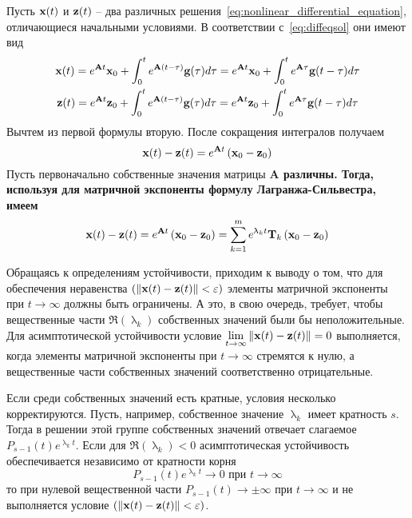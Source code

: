 Пусть $\bf{x}(t)$ и $\bf{z}(t)$ -- два различных решения~\eqref{eq:nonlinear_differential_equation}, отличающиеся начальными условиями. В
соответствии с~\eqref{eq:diffeqsol} они имеют вид
\begin{gather*}
    \bf{x}(t) = e^{\bf{A}t}\bf{x}_0 + \int_{0}^{t} e^{\bf{A}(t - \tau)}\bf{g}(\tau)d\tau = e^{\bf{A}t}\bf{x}_0 + \int_{0}^{t} e^{\bf{A}\tau}\bf{g}(t - \tau)d\tau\\
    \bf{z}(t) = e^{\bf{A}t}\bf{z}_0 + \int_{0}^{t} e^{\bf{A}(t - \tau)}\bf{g}(\tau)d\tau = e^{\bf{A}t}\bf{z}_0 + \int_{0}^{t} e^{\bf{A}\tau}\bf{g}(t - \tau)d\tau
\end{gather*}
Вычтем из первой формулы вторую. После сокращения интегралов получаем
\begin{equation*}
    \bf{x}(t) - \bf{z}(t) = e^{\bf{A}t}\left( \bf{x}_0 - \bf{z}_0 \right)
\end{equation*}
Пусть первоначально собственные значения матрицы \bf{A} различны. Тогда, используя для матричной экспоненты формулу
Лагранжа-Сильвестра, имеем
\begin{equation*}
    \bf{x}(t) - \bf{z}(t) = e^{\bf{A}t}\left( \bf{x}_0 - \bf{z}_0 \right) = \sum_{k=1}^{m} e^{\uplambda_k t}\bf{T}_k \left( \bf{x}_0 - \bf{z}_0 \right)
\end{equation*}

Обращаясь к определениям устойчивости, приходим к выводу о том, что для обеспечения неравенства
$\displaystyle \left( \left\| \bf{x}(t) - \bf{z}(t) \right\| < \varepsilon \right)$ элементы матричной экспоненты при $t \rightarrow \infty$ должны
быть ограничены. А это, в свою очередь, требует, чтобы вещественные части $\displaystyle \Re(\uplambda_k)$ собственных
значений были бы неположительные. Для асимптотической устойчивости условие $\displaystyle \lim_{t \rightarrow \infty} \left\| \bf{x}(t) - \bf{z}(t) \right\| = 0$
выполняется, когда элементы матричной экспоненты при $t \rightarrow \infty$ стремятся к нулю, а вещественные части собственных значений
соответственно отрицательные.

Если среди собственных значений есть кратные, условия несколько корректируются. Пусть, например, собственное значение
$\uplambda_k$ имеет кратность $s$. Тогда в решении этой группе собственных значений отвечает слагаемое
$\displaystyle P_{s-1}(t)e^{\uplambda_k t}$. Если для $\Re(\uplambda_k) < 0$ асимптотическая устойчивость обеспечивается
независимо от кратности корня
\begin{equation*}
    P_{s-1}(t) e^{\uplambda_k t} \rightarrow 0 \text{ при } t \rightarrow \infty
\end{equation*}
то при нулевой вещественной части $P_{s-1}(t) \rightarrow \pm \infty$ при $t \rightarrow \infty$ и не выполняется условие
$\displaystyle \left( \left\| \bf{x}(t) - \bf{z}(t) \right\| < \varepsilon \right)$.

